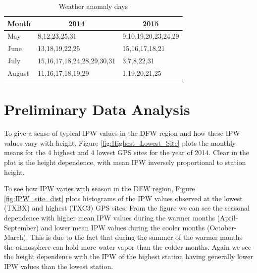 \documentclass[proposal]{umassthesis}
\begin{document}

\begin{table}[]
\centering
\caption{Weather anomaly days}
\label{table:weather anomaly}
\begin{tabular}{|l|l|l|}
\hline
\multicolumn{1}{|c|}{Month} & \multicolumn{1}{c|}{2014} & \multicolumn{1}{c|}{2015} \\ \hline
May & 	8,12,23,25,31	 & 	9,10,19,20,23,24,29	\\	\hline
June & 	13,18,19,22,25	 & 	15,16,17,18,21	\\	\hline
July & 	15,16,17,18,24,28,29,30,31	 & 	3,7,8,22,31	\\	\hline
August & 	11,16,17,18,19,29	 & 	1,19,20,21,25	\\	\hline
\end{tabular}
\end{table}
\section{Preliminary Data Analysis}

To give a sense of typical IPW values in the DFW region and how these IPW values vary with height, Figure \ref{fig:Highest_Lowest_Site} plots the monthly means for the 4 highest and 4 lowest GPS sites for the year of 2014. Clear in the plot is the height dependence, with mean IPW inversely proportional to station height.

To see how IPW varies with season in the DFW region, Figure \ref{fig:IPW_site_dist} plots histograms of the IPW values observed at the lowest (TXBX) and highest (TXC3) GPS sites. From the figure we can see the seasonal dependence with higher mean IPW values during the warmer months (April-September) and lower mean IPW values during the cooler months (October-March). This is due to the fact that during the summer of the warmer months the atmosphere can hold more water vapor than the colder months. Again we see the height dependence with the IPW of the highest station having generally lower IPW values than the lowest station. 
\end{document}
